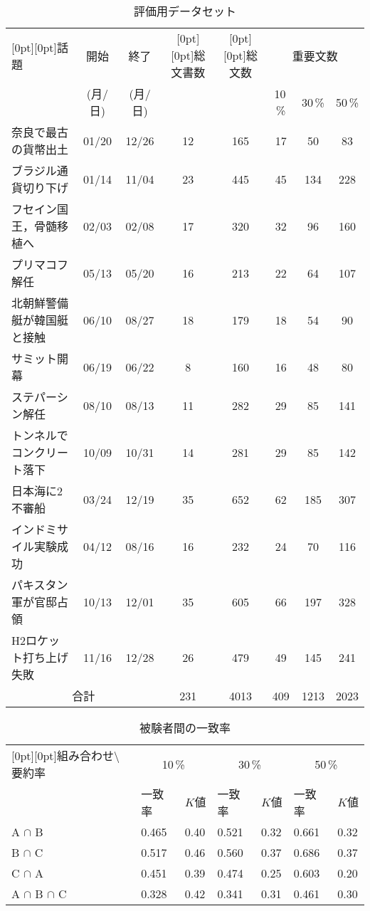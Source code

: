 \begin{table}[t]
 \begin{center}
  \caption{評価用データセット}
  \label{tab02}
  \begin{tabular}{l|c|c|c|c|ccc}
   \hline
   \hline
\raisebox{-1.8ex}[0pt][0pt]{話題} & {開始} &{終了} &\raisebox{-1.8ex}[0pt][0pt]{総文書数} & \raisebox{-1.8ex}[0pt][0pt]{総文数} & \multicolumn{3}{|c}{重要文数} \\   
   \cline{6-8}
   & (月/日)& (月/日)&  &  & 10\,\% & 30\,\% & 50\,\% \\
   \hline
   奈良で最古の貨幣出土 & 01/20& 12/26&12 & 165 & 17 & 50 & 83\\
   ブラジル通貨切り下げ & 01/14& 11/04&23 & 445 & 45 & 134 & 228\\
   フセイン国王，骨髄移植へ & 02/03& 02/08&17 & 320 & 32 & 96 & 160\\
   プリマコフ解任 & 05/13 & 05/20&16 & 213 & 22 & 64 & 107\\
   北朝鮮警備艇が韓国艇と接触& 06/10& 08/27&18 & 179 & 18 & 54 & 90\\
   サミット開幕 & 06/19& 06/22&8 & 160 & 16 & 48 & 80\\
   ステパーシン解任 & 08/10& 08/13&11 & 282 & 29 & 85 & 141\\
   トンネルでコンクリート落下 & 10/09 & 10/31&14 & 281 & 29 & 85 & 142\\
   日本海に2不審船 & 03/24& 12/19&35 & 652 & 62 & 185 & 307\\
   インドミサイル実験成功 & 04/12& 08/16&16 & 232 & 24 & 70 & 116\\
   パキスタン軍が官邸占領 & 10/13& 12/01&35 & 605 & 66 & 197 & 328\\
   H2ロケット打ち上げ失敗 & 11/16& 12/28&26 & 479 & 49 & 145 & 241\\
   \hline
   \multicolumn{3}{c|}{合計}& 231 & 4013& 409 &  1213& 2023\\
   \hline
  \end{tabular}
 \end{center}
\end{table}


\begin{table}[t]
 \begin{center}
  \caption{被験者間の一致率}
  \label{tab03}
  \begin{tabular}{l|ll|ll|ll}
   \hline
   \hline
   \raisebox{-1.8ex}[0pt][0pt]{組み合わせ$\setminus$要約率} & \multicolumn{2}{|c|}{10\,\%} &
   \multicolumn{2}{|c|}{30\,\%} & \multicolumn{2}{|c}{50\,\%}\\   
   \cline{2-7}
    & 一致率 & $K値$ & 一致率 & $K値$ & 一致率 & $K値$\\
   \hline
   A $\cap$ B & 0.465 & 0.40 & 0.521 & 0.32 & 0.661 &0.32 \\
   B $\cap$ C & 0.517 & 0.46 & 0.560 & 0.37 & 0.686 &0.37\\
   C $\cap$ A & 0.451 & 0.39 & 0.474 & 0.25 & 0.603 &0.20\\
   A $\cap$ B $\cap$ C & 0.328 & 0.42 & 0.341 & 0.31 & 0.461 &0.30 \\
   \hline
  \end{tabular}
 \end{center}
\end{table}

